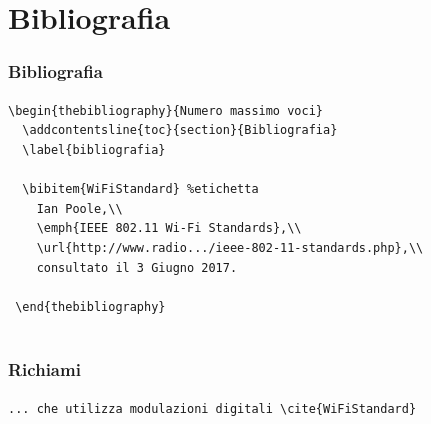 \documentclass[aspectratio=169,compress]{beamer}
\begin{document}
\section{Bibliografia}
\begin{frame}[fragile]\transfade\centering
  \frametitle{Bibliografia}
  \verb!\begin{thebibliography}{Numero massimo voci}               !\\
  \verb!  \addcontentsline{toc}{section}{Bibliografia}             !\\
  \verb!  \label{bibliografia}                                     !\\
  ~\\
  \verb!  \bibitem{WiFiStandard} %etichetta                        !\\
  \verb!    Ian Poole,\\                                           !\\
  \verb!    \emph{IEEE 802.11 Wi-Fi Standards},\\                  !\\
  \verb!    \url{http://www.radio.../ieee-802-11-standards.php},\\ !\\
  \verb!    consultato il 3 Giugno 2017.                           !\\
  ~\\
  \verb! \end{thebibliography}                                     !\\~
\end{frame}
\begin{frame}[fragile]\transfade\centering
  \frametitle{Richiami}
  \verb!... che utilizza modulazioni digitali \cite{WiFiStandard}!\\~\\~
  \\~
\end{frame}
\end{document}
